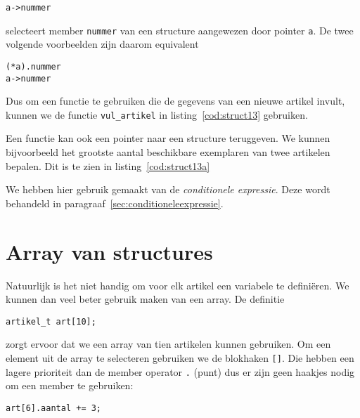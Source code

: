 \hspace*{1em}\texttt{a->nummer}

selecteert member \texttt{nummer} van een structure aangewezen door pointer \texttt{a}. De twee volgende voorbeelden zijn daarom equivalent

\hspace*{1em}\texttt{(*a).nummer}\\
\hspace*{1em}\texttt{a->nummer}

Dus om een functie te gebruiken die de gegevens van een nieuwe artikel invult, kunnen we de functie \texttt{vul\_artikel} in listing~\ref{cod:struct13} gebruiken.


Een functie kan ook een pointer naar een structure teruggeven. We kunnen bijvoorbeeld het grootste aantal beschikbare exemplaren van twee artikelen bepalen. Dit is te zien in listing~\ref{cod:struct13a}


We hebben hier gebruik gemaakt van de \textsl{conditionele expressie}. Deze wordt behandeld in paragraaf~\ref{sec:conditioneleexpressie}.

\section{Array van structures}
Natuurlijk is het niet handig om voor elk artikel een variabele te definiëren. We kunnen dan veel beter gebruik maken van een array. De definitie

\hspace*{1em}\texttt{artikel\_t art[10];}

zorgt ervoor dat we een array van tien artikelen kunnen gebruiken. Om een element uit de array te selecteren gebruiken we de blokhaken \texttt{[]}. Die hebben een lagere prioriteit dan de member operator \texttt{.} (punt) dus er zijn geen haakjes nodig om een member te gebruiken:

\hspace*{1em}\texttt{art[6].aantal += 3;}

